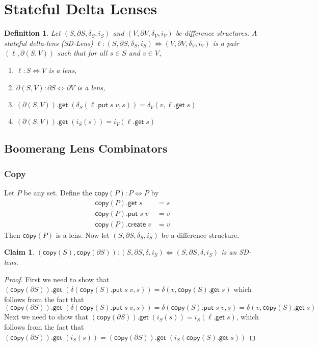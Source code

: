 \documentclass[acmsmall,review,anonymous]{acmart}\settopmatter{printfolios=true,printccs=false,printacmref=false}
\newtheorem{definition}{Definition}
\newtheorem{claim}{Claim}
\newcommand{\kw}[1]{\ensuremath{\mathsf{#1}}}
\newcommand{\get}{\ensuremath{\kw{get}}}
\newcommand{\pput}{\ensuremath{\kw{put}}}
\newcommand{\create}{\ensuremath{\kw{create}}}
\newcommand{\ccopy}{\ensuremath{\kw{copy}}}
\begin{document}
\section{Stateful Delta Lenses}
\begin{definition}
Let $(S, \partial S, \delta_S, i_S)$ and $(V, \partial V, \delta_V, i_V)$ be
difference structures. A stateful delta-lens (SD-Lens) $\ell : (S, \partial S,
\delta_S, i_S) \Leftrightarrow (V, \partial V, \delta_V, i_V)$ is a pair
$(\ell, \partial (S, V))$ such that for all $s \in S$ and $v \in V$,
\begin{enumerate}
  \item
  $\ell : S \Leftrightarrow V$ is a lens,
  \item
  $\partial(S, V) : \partial S \Leftrightarrow \partial V$ is a lens,
  \item
  $(\partial (S, V)).\get \; (\delta_S(\ell.\pput \; s \; v, s)) = \delta_V(v,
  \ell.\get \; s)$
  \item
  $(\partial (S, V)).\get \; (i_{S}(s)) = i_{V}(\ell.\get \; s)$
\end{enumerate}

\end{definition}
\subsection{Boomerang Lens Combinators}
\subsubsection{Copy}
Let $P$ be any set. Define the $\ccopy(P) : P \Leftrightarrow P$ by
\begin{align}
\ccopy(P).\get \; s &= s\\
\ccopy(P).\pput \; s \; v &= v\\
\ccopy(P).\create \; v &= v
\end{align}
Then $\ccopy(P)$ is a lens. Now let $(S, \partial S, \delta_S, i_S)$ be a
difference structure.
\begin{claim}
$(\ccopy(S),  \ccopy(\partial S)) : (S, \partial S, \delta, i_S)
\Leftrightarrow (S, \partial S, \delta, i_S)$ is an SD-lens.
\end{claim}
\begin{proof}
First we need to show that $(\ccopy(\partial S)).\get \; (\delta(\ccopy(S).\pput
\; s \; v, s)) = \delta(v, \ccopy(S).\get \; s)$ which follows from the fact that
$$ (\ccopy(\partial S)).\get \; (\delta(\ccopy(S).\pput \; s
\; v, s)) = \delta(\ccopy(S).\pput \; s \; v, s) = \delta(v, \ccopy(S).\get
\; s) $$
Next we need to show that $(\ccopy(\partial S)).\get \; (i_{S}(s)) =
i_{S}(\ell.\get \; s)$, which follows from the fact that $(\ccopy(\partial
S)).\get \; (i_{S}(s)) = (\ccopy(\partial S)).\get \; (i_{S}(\ccopy(S).\get \;
s))$
\end{proof}
\end{document}
